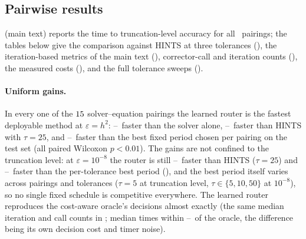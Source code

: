 \subsection{Pairwise results}

 (main text) reports the time to truncation-level accuracy for all \caNumCells\ pairings; the tables below give the comparison against HINTS at three tolerances (), the iteration-based metrics of the main text (), corrector-call and iteration counts (), the measured costs (), and the full tolerance sweeps ().

\paragraph{Uniform gains.} In every one of the $15$ solver--equation pairings the learned router is the fastest deployable method at $\varepsilon = h^2$: \caSpSolverMin--\caSpSolverMax\ faster than the solver alone, \caSpHintsMin--\caSpHintsMax\ faster than HINTS with $\tau{=}25$, and \caSpBestMin--\caSpBestMax\ faster than the best fixed period chosen per pairing on the test set (all paired Wilcoxon $p < 0.01$). The gains are not confined to the truncation level: at $\varepsilon = 10^{-8}$ the router is still \caSpHintsDeepMin--\caSpHintsDeepMax\ faster than HINTS ($\tau{=}25$) and \caSpBestDeepMin--\caSpBestDeepMax\ faster than the per-tolerance best period (), and the best period itself varies across pairings and tolerances ($\tau{=}5$ at truncation level, $\tau \in \{5, 10, 50\}$ at $10^{-8}$), so no single fixed schedule is competitive everywhere. The learned router reproduces the cost-aware oracle's decisions almost exactly (the same median iteration and call counts in ; median times within \caSpOracleRatioMin--\caSpOracleRatioMax\ of the oracle, the difference being its own decision cost and timer noise).

